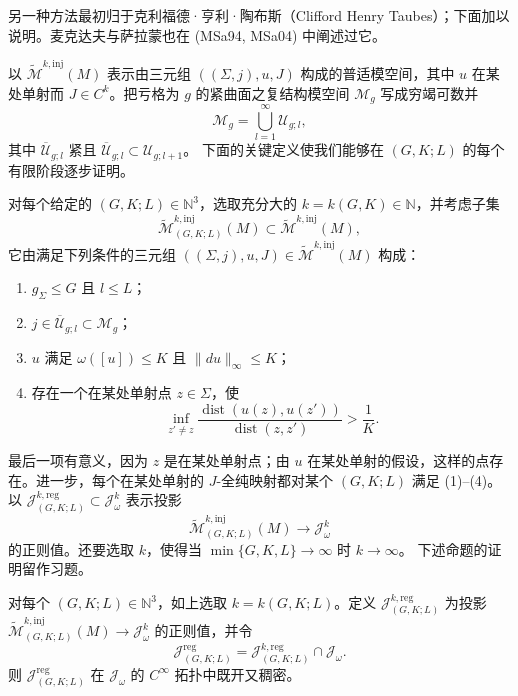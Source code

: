 另一种方法最初归于克利福德·亨利·陶布斯（Clifford Henry Taubes）；下面加以说明。麦克达夫与萨拉蒙也在
(MSa94, MSa04) 中阐述过它。

以 $\widetilde{\mathcal M}^{k,\mathrm{inj}}(M)$ 表示由三元组
$((\Sigma,j),u,J)$ 构成的普适模空间，其中 $u$ 在某处单射而 $J\in C^k$。把亏格为
$g$ 的紧曲面之复结构模空间 $\mathcal M_g$ 写成穷竭可数并
\[
 \mathcal M_g=\bigcup_{l=1}^\infty\mathcal U_{g;l},
\]
其中 $\overline{\mathcal U}_{g;l}$ 紧且
$\overline{\mathcal U}_{g;l}\subset\mathcal U_{g;l+1}$。
下面的关键定义使我们能够在 $(G,K;L)$ 的每个有限阶段逐步证明。

\begin{definition}\label{def:taubes-finite-stage-moduli}
对每个给定的 $(G,K;L)\in\mathbb N^3$，选取充分大的
$k=k(G,K)\in\mathbb N$，并考虑子集
\[
 \widetilde{\mathcal M}_{(G,K;L)}^{k,\mathrm{inj}}(M)
 \subset\widetilde{\mathcal M}^{k,\mathrm{inj}}(M),
\]
它由满足下列条件的三元组
$((\Sigma,j),u,J)\in\widetilde{\mathcal M}^{k,\mathrm{inj}}(M)$ 构成：
\begin{enumerate}[label=(\arabic*)]
 \item $g_\Sigma\leq G$ 且 $l\leq L$；
 \item $j\in\overline{\mathcal U}_{g;l}\subset\mathcal M_g$；
 \item $u$ 满足 $\omega([u])\leq K$ 且 $\|du\|_\infty\leq K$；
 \item 存在一个在某处单射点 $z\in\Sigma$，使
 \begin{equation}
  \inf_{z'\ne z}\frac{\operatorname{dist}(u(z),u(z'))}
  {\operatorname{dist}(z,z')}>\frac1K.
  \label{eq:taubes-uniform-injectivity}
 \end{equation}
\end{enumerate}
\end{definition}

最后一项有意义，因为 $z$ 是在某处单射点；由 $u$ 在某处单射的假设，这样的点存在。进一步，每个在某处单射的
$J$-全纯映射都对某个 $(G,K;L)$ 满足 (1)--(4)。以
$\mathcal J_{(G,K;L)}^{k,\mathrm{reg}}\subset\mathcal J_\omega^k$ 表示投影
\[
 \widetilde{\mathcal M}_{(G,K;L)}^{k,\mathrm{inj}}(M)
 \longrightarrow\mathcal J_\omega^k
\]
的正则值。还要选取 $k$，使得当
$\min\{G,K,L\}\to\infty$ 时 $k\to\infty$。
下述命题的证明留作习题。

\begin{proposition}\label{prop:taubes-open-dense-regular-values}
对每个 $(G,K;L)\in\mathbb N^3$，如上选取
$k=k(G,K;L)$。定义
$\mathcal J_{(G,K;L)}^{k,\mathrm{reg}}$ 为投影
$\widetilde{\mathcal M}_{(G,K;L)}^{k,\mathrm{inj}}(M)\to
\mathcal J_\omega^k$ 的正则值，并令
\[
 \mathcal J_{(G,K;L)}^{\mathrm{reg}}
 =\mathcal J_{(G,K;L)}^{k,\mathrm{reg}}\cap\mathcal J_\omega.
\]
则 $\mathcal J_{(G,K;L)}^{\mathrm{reg}}$ 在
$\mathcal J_\omega$ 的 $C^\infty$ 拓扑中既开又稠密。
\end{proposition}

